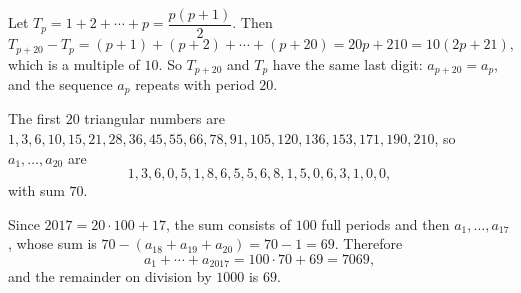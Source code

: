 Let $T_p=1+2+\cdots+p=\dfrac{p(p+1)}{2}$. Then
\[T_{p+20}-T_p=(p+1)+(p+2)+\cdots+(p+20)=20p+210=10(2p+21),\]
which is a multiple of $10$. So $T_{p+20}$ and $T_p$ have the same last digit: $a_{p+20}=a_p$, and the sequence $a_p$ repeats with period $20$.

The first $20$ triangular numbers are $1,3,6,10,15,21,28,36,45,55,66,78,91,105,120,136,153,171,190,210$, so $a_1,\dots,a_{20}$ are
\[1,3,6,0,5,1,8,6,5,5,6,8,1,5,0,6,3,1,0,0,\]
with sum $70$.

Since $2017=20\cdot100+17$, the sum consists of $100$ full periods and then $a_1,\dots,a_{17}$, whose sum is $70-(a_{18}+a_{19}+a_{20})=70-1=69$. Therefore
\[a_1+\cdots+a_{2017}=100\cdot70+69=7069,\]
and the remainder on division by $1000$ is $\boxed{69}$.
